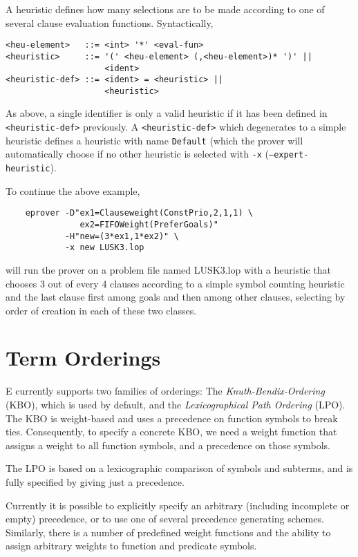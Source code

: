 \documentclass{report}
\begin{document}
A heuristic defines how many selections are to be made according to
one of several clause evaluation functions. Syntactically,

\begin{verbatim}
<heu-element>   ::= <int> '*' <eval-fun>
<heuristic>     ::= '(' <heu-element> (,<heu-element>)* ')' ||
                    <ident>
<heuristic-def> ::= <ident> = <heuristic> ||
                    <heuristic>
\end{verbatim}

As above, a single identifier is only a valid heuristic if it has been
defined in \texttt{<heuristic-def>} previously. A
\texttt{<heuristic-def>} which degenerates to a simple heuristic
defines a heuristic with name \texttt{Default} (which the prover will
automatically choose if no other heuristic is selected with
\texttt{-x} (\texttt{--expert-heuristic}).

\begin{example}
  To continue the above example,
\begin{verbatim}
    eprover -D"ex1=Clauseweight(ConstPrio,2,1,1) \
               ex2=FIFOWeight(PreferGoals)"
            -H"new=(3*ex1,1*ex2)" \
            -x new LUSK3.lop
\end{verbatim}
  will run the prover on a problem file named LUSK3.lop with a
  heuristic that chooses 3 out of every 4 clauses according to a
  simple symbol counting heuristic and the last clause first among
  goals and then among other clauses, selecting by order of creation
  in each of these two classes.
\end{example}


\section{Term Orderings}
\label{sec:options:orderings}

E currently supports two families of orderings: The
\emph{Knuth-Bendix-Ordering} (KBO), which is used by default, and the
\emph{Lexicographical Path Ordering} (LPO). The KBO is weight-based
and uses a precedence on function symbols to break ties. Consequently,
to specify a concrete KBO, we need a weight function that assigns a
weight to all function symbols, and a precedence on those symbols.

The LPO is based on a lexicographic comparison of symbols and
subterms, and is fully specified by giving just a precedence.

Currently it is possible to explicitly specify an arbitrary (including
incomplete or empty) precedence, or to use one of several precedence
generating schemes. Similarly, there is a number of predefined weight
functions and the ability to assign arbitrary weights to function and
predicate symbols.
\end{document}
